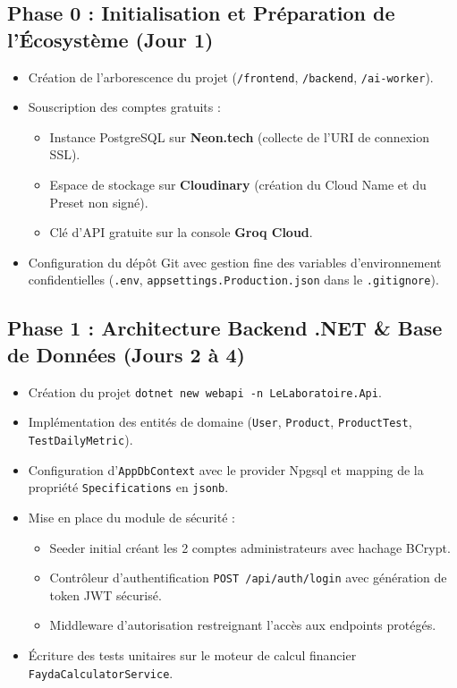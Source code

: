 \documentclass[11pt,a4paper]{article}
\begin{document}
\subsection{Phase 0 : Initialisation et Préparation de l'Écosystème (Jour 1)}
\begin{itemize}[leftmargin=*]
    \item Création de l'arborescence du projet (\texttt{/frontend}, \texttt{/backend}, \texttt{/ai-worker}).
    \item Souscription des comptes gratuits :
    \begin{itemize}
        \item Instance PostgreSQL sur \textbf{Neon.tech} (collecte de l'URI de connexion SSL).
        \item Espace de stockage sur \textbf{Cloudinary} (création du Cloud Name et du Preset non signé).
        \item Clé d'API gratuite sur la console \textbf{Groq Cloud}.
    \end{itemize}
    \item Configuration du dépôt Git avec gestion fine des variables d'environnement confidentielles (\texttt{.env}, \texttt{appsettings.Production.json} dans le \texttt{.gitignore}).
\end{itemize}

\subsection{Phase 1 : Architecture Backend .NET \& Base de Données (Jours 2 à 4)}
\begin{itemize}[leftmargin=*]
    \item Création du projet \texttt{dotnet new webapi -n LeLaboratoire.Api}.
    \item Implémentation des entités de domaine (\texttt{User}, \texttt{Product}, \texttt{ProductTest}, \texttt{TestDailyMetric}).
    \item Configuration d'\texttt{AppDbContext} avec le provider Npgsql et mapping de la propriété \texttt{Specifications} en \texttt{jsonb}.
    \item Mise en place du module de sécurité :
    \begin{itemize}
        \item Seeder initial créant les 2 comptes administrateurs avec hachage BCrypt.
        \item Contrôleur d'authentification \texttt{POST /api/auth/login} avec génération de token JWT sécurisé.
        \item Middleware d'autorisation restreignant l'accès aux endpoints protégés.
    \end{itemize}
    \item Écriture des tests unitaires sur le moteur de calcul financier \texttt{FaydaCalculatorService}.
\end{itemize}
\end{document}
